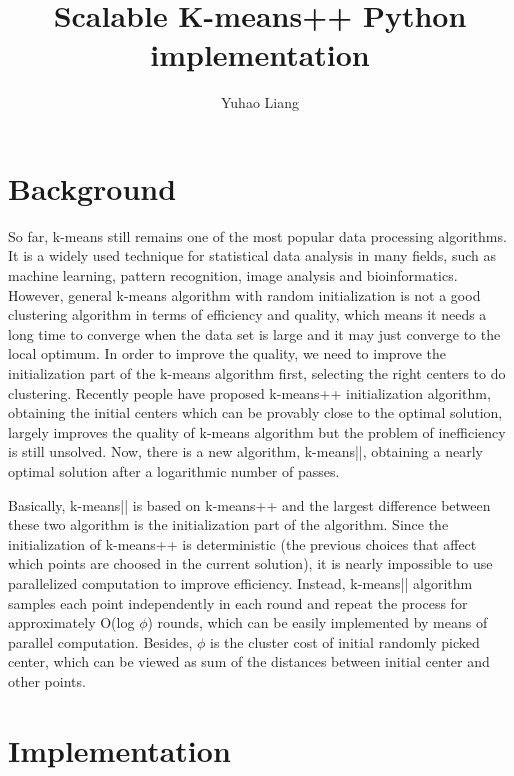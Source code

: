 \documentclass{article}
\begin{document}
\title{Scalable K-means++ Python implementation}
\author{Yuhao Liang}
\maketitle

\section{Background}

So far, k-means still remains one of the most popular data processing algorithms. It is a widely used technique for statistical data analysis in many fields, such as machine learning, pattern recognition, image analysis and bioinformatics. However, general k-means algorithm with random initialization is not a good clustering algorithm in terms of efficiency and quality, which means it needs a long time to converge when the data set is large and it may just converge to the local optimum. In order to improve the quality, we need to improve the initialization part of the k-means algorithm first, selecting the right centers to do clustering. Recently people have proposed k-means++ initialization algorithm, obtaining the initial centers which can be provably close to the optimal solution, largely improves the quality of k-means algorithm but the problem of inefficiency is still unsolved. Now, there is a new algorithm, k-means||, obtaining a nearly optimal solution after a logarithmic number of passes.

Basically, k-means|| is based on k-means++ and the largest difference between these two algorithm is the initialization part of the algorithm. Since the initialization of k-means++ is deterministic (the previous choices that affect which points are choosed in the current solution), it is nearly impossible to use parallelized computation to improve efficiency. Instead, k-means|| algorithm samples each point independently in each round and repeat the process for approximately O(log $\phi$) rounds, which can be easily implemented by means of parallel computation. Besides, $\phi$ is the cluster cost of initial randomly picked center, which can be viewed as sum of the distances between initial center and other points.


\section{Implementation}
\end{document}
